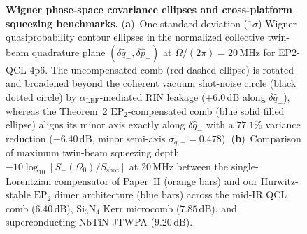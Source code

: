 \documentclass[11pt,letterpaper]{article}
\theoremstyle{definition}
\theoremstyle{remark}
\begin{document}
\begin{figure}[t!]
\centering
\resizebox{0.98\textwidth}{!}{}
\caption{\textbf{Wigner phase-space covariance ellipses and cross-platform squeezing benchmarks.} (\textbf{a})~One-standard-deviation ($1\sigma$) Wigner quasiprobability contour ellipses in the normalized collective twin-beam quadrature plane $(\delta\hat{q}_-, \delta\hat{p}_+)$ at $\Omega/(2\pi) = 20\,\mathrm{MHz}$ for EP2-QCL-4p6. The uncompensated comb (red dashed ellipse) is rotated and broadened beyond the coherent vacuum shot-noise circle (black dotted circle) by $\alpha_{\mathrm{LEF}}$-mediated RIN leakage ($+6.0\,\mathrm{dB}$ along $\delta\hat{q}_-$), whereas the Theorem~2 $\mathrm{EP}_2$-compensated comb (blue solid filled ellipse) aligns its minor axis exactly along $\delta\hat{q}_-$ with a $77.1\%$ variance reduction ($-6.40\,\mathrm{dB}$, minor semi-axis $\sigma_{q,-} = 0.478$). (\textbf{b})~Comparison of maximum twin-beam squeezing depth $-10\log_{10}[S_-(\Omega_0)/S_{\mathrm{shot}}]$ at $20\,\mathrm{MHz}$ between the single-Lorentzian compensator of Paper~II (orange bars) and our Hurwitz-stable $\mathrm{EP}_2$ dimer architecture (blue bars) across the mid-IR QCL comb ($6.40\,\mathrm{dB}$), $\mathrm{Si_3N_4}$ Kerr microcomb ($7.85\,\mathrm{dB}$), and superconducting $\mathrm{NbTiN}$ JTWPA ($9.20\,\mathrm{dB}$).}
\label{fig:wigner_cross_platform}
\end{figure}
\end{document}

